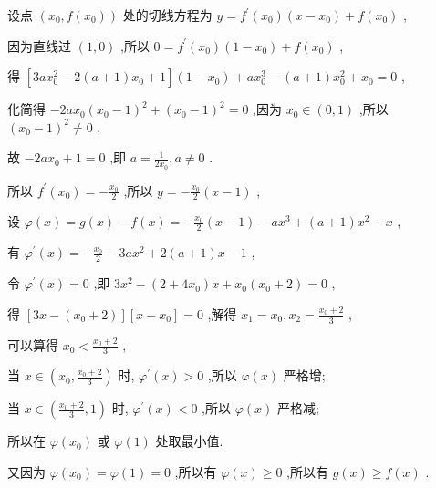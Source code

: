 \documentclass[10pt]{article}
\begin{document}
设点 \(\left( {{x}_{0},f\left( {x}_{0}\right) }\right)\) 处的切线方程为 \(y = {f}^{\prime }\left( {x}_{0}\right) \left( {x - {x}_{0}}\right)  + f\left( {x}_{0}\right)\) ,

因为直线过 \(\left( {1,0}\right)\) ,所以 \(0 = {f}^{\prime }\left( {x}_{0}\right) \left( {1 - {x}_{0}}\right)  + f\left( {x}_{0}\right)\) ,

得 \(\left\lbrack  {{3a}{x}_{0}^{2} - 2\left( {a + 1}\right) {x}_{0} + 1}\right\rbrack  \left( {1 - {x}_{0}}\right)  + a{x}_{0}^{3} - \left( {a + 1}\right) {x}_{0}^{2} + {x}_{0} = 0\) ,

化简得 \(- {2a}{x}_{0}{\left( {x}_{0} - 1\right) }^{2} + {\left( {x}_{0} - 1\right) }^{2} = 0\) ,因为 \({x}_{0} \in  \left( {0,1}\right)\) ,所以 \({\left( {x}_{0} - 1\right) }^{2} \neq  0\) ,

故 \(- {2a}{x}_{0} + 1 = 0\) ,即 \(a = \frac{1}{2{x}_{0}},a \neq  0\) .

所以 \({f}^{\prime }\left( {x}_{0}\right)  =  - \frac{{x}_{0}}{2}\) ,所以 \(y =  - \frac{{x}_{0}}{2}\left( {x - 1}\right)\) ,

设 \(\varphi \left( x\right)  = g\left( x\right)  - f\left( x\right)  =  - \frac{{x}_{0}}{2}\left( {x - 1}\right)  - a{x}^{3} + \left( {a + 1}\right) {x}^{2} - x\) ,

有 \({\varphi }^{\prime }\left( x\right)  =  - \frac{{x}_{0}}{2} - {3a}{x}^{2} + 2\left( {a + 1}\right) x - 1\) ,

令 \({\varphi }^{\prime }\left( x\right)  = 0\) ,即 \(3{x}^{2} - \left( {2 + 4{x}_{0}}\right) x + {x}_{0}\left( {{x}_{0} + 2}\right)  = 0\) ,

得 \(\left\lbrack  {{3x} - \left( {{x}_{0} + 2}\right) }\right\rbrack  \left\lbrack  {x - {x}_{0}}\right\rbrack   = 0\) ,解得 \({x}_{1} = {x}_{0},{x}_{2} = \frac{{x}_{0} + 2}{3}\) ,

可以算得 \({x}_{0} < \frac{{x}_{0} + 2}{3}\) ,

当 \(x \in  \left( {{x}_{0},\frac{{x}_{0} + 2}{3}}\right)\) 时, \({\varphi }^{\prime }\left( x\right)  > 0\) ,所以 \(\varphi \left( x\right)\) 严格增;

当 \(x \in  \left( {\frac{{x}_{0} + 2}{3},1}\right)\) 时, \({\varphi }^{\prime }\left( x\right)  < 0\) ,所以 \(\varphi \left( x\right)\) 严格减;

所以在 \(\varphi \left( {x}_{0}\right)\) 或 \(\varphi \left( 1\right)\) 处取最小值.

又因为 \(\varphi \left( {x}_{0}\right)  = \varphi \left( 1\right)  = 0\) ,所以有 \(\varphi \left( x\right)  \geq  0\) ,所以有 \(g\left( x\right)  \geq  f\left( x\right)\) .
\end{document}
